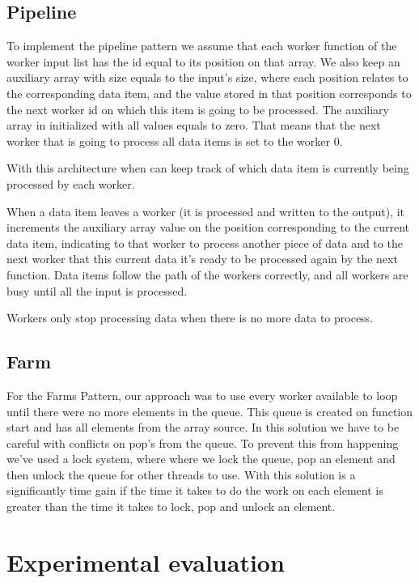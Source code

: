 \documentclass[10pt,journal,compsoc]{IEEEtran}
\begin{document}
\subsection{Pipeline}

To implement the pipeline pattern we assume that each worker function of the worker input list has the id equal to its position on that array. We also keep an auxiliary array with size equals to the input's size, where each position relates to the corresponding data item, and the value stored in that position corresponds to the next worker id on which this item is going to be processed. The auxiliary array in initialized with all values equals to zero. That means that the next worker that is going to process all data items is set to the worker 0.

With this architecture when can keep track of which data item is currently being processed by each worker. 

When a data item leaves a worker (it is processed and written to the output), it increments the auxiliary array value on the position corresponding to the current data item, indicating to that worker to process another piece of data and to the next worker that this current data it's ready to be processed again by the next function. Data items follow the path of the workers correctly, and all workers are busy until all the input is processed.

Workers only stop processing data when there is no more data to process.

\subsection{Farm}

For the Farms Pattern, our approach was to use every worker available to loop until there were no more elements in the queue. This queue is created on function start and has all elements from the array source. In this solution we have to be careful with conflicts on pop's from the queue. To prevent this from happening we've used a lock system, where where we lock the queue, pop an element and then unlock the queue for other threads to use. With this solution is a significantly time gain if the time it takes to do the work on each element is greater than the time it takes to lock, pop and unlock an element.

\section{Experimental evaluation}
\end{document}
